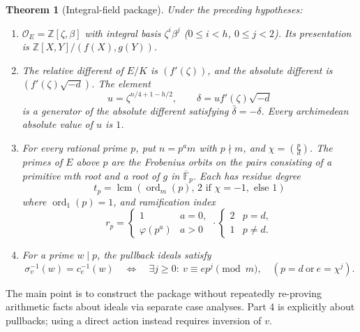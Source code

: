 \documentclass[11pt]{article}
\newtheorem{theorem}{Theorem}\newtheorem{lemma}[theorem]{Lemma}\newtheorem{corollary}[theorem]{Corollary}
\newcommand{\Z}{\mathbb Z}\newcommand{\Q}{\mathbb Q}\newcommand{\F}{\mathbb F}\newcommand{\OO}{\mathcal O}\newcommand{\Tr}{\operatorname{Tr}}\newcommand{\ord}{\operatorname{ord}}\newcommand{\lcm}{\operatorname{lcm}}\newcommand{\codiff}{\mathfrak D^{-1}}\newcommand{\src}[2]{\href{https://github.com/VladimirReshetnikov/ProveIt/blob/fd695fd462aa31b25af3335e2a9c3b6e014b055f/Analysis/GeneralizedRiemannHypothesis/Lean/grh/src/#1}{#2}}
\begin{document}
\begin{theorem}[Integral-field package]\label{thm:package}
Under the preceding hypotheses:
\begin{enumerate}
\item $\OO_E=\Z[\zeta,\beta]$ with integral basis $\zeta^i\beta^j$ ($0\le i<h$, $0\le j<2$). Its presentation is $\Z[X,Y]/(f(X),g(Y))$.
\item The relative different of $E/K$ is $(f'(\zeta))$, and the absolute different is $(f'(\zeta)\sqrt{-d})$. The element
\[
 u=\zeta^{n/4+1-h/2},\qquad \delta=u f'(\zeta)\sqrt{-d}
\]
is a generator of the absolute different satisfying $\bar\delta=-\delta$. Every archimedean absolute value of $u$ is $1$.
\item For every rational prime $p$, put $n=p^a m$ with $p\nmid m$, and $\chi=\left(\frac p d\right)$. The primes of $E$ above $p$ are the Frobenius orbits on the pairs consisting of a primitive $m$th root and a root of $g$ in $\overline{\F}_p$. Each has residue degree
\[
 t_p=\lcm(\ord_m(p),\, 2\text{ if }\chi=-1,\text{ else }1)
\]
where $\ord_1(p)=1$, and ramification index
\[
 r_p=\begin{cases}1&a=0,\\\varphi(p^a)&a>0\end{cases}
 \cdot\begin{cases}2&p=d,\\1&p\ne d.\end{cases}
\]
\item For a prime $w\mid p$, the pullback ideals satisfy
\begin{equation}\label{eq:pullback}
 \sigma_v^{-1}(w)=c_e^{-1}(w)\quad\Longleftrightarrow\quad
 \exists j\ge0:\ v\equiv e p^j\pmod m,\quad
 (p=d\ \text{or}\ e=\chi^j).
\end{equation}
\end{enumerate}
\end{theorem}
The main point is to construct the package without repeatedly re-proving arithmetic facts about ideals via separate case analyses. Part 4 is explicitly about pullbacks; using a direct action instead requires inversion of $v$.
\end{document}
